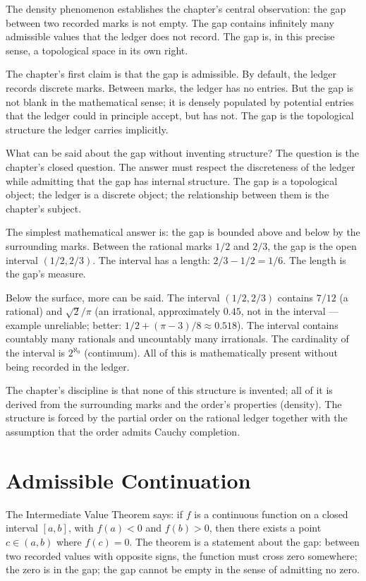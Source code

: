 The density phenomenon establishes the chapter's central observation:
the gap between two recorded marks is not empty. The gap contains
infinitely many admissible values that the ledger does not record. The
gap is, in this precise sense, a topological space in its own right.

The chapter's first claim is that the gap is admissible. By default,
the ledger records discrete marks. Between marks, the ledger has no
entries. But the gap is not blank in the mathematical sense; it is
densely populated by potential entries that the ledger could in
principle accept, but has not. The gap is the topological structure
the ledger carries implicitly.

What can be said about the gap without inventing structure? The
question is the chapter's closed question. The answer must respect
the discreteness of the ledger while admitting that the gap has
internal structure. The gap is a topological object; the ledger is
a discrete object; the relationship between them is the chapter's
subject.

The simplest mathematical answer is: the gap is bounded above and
below by the surrounding marks. Between the rational marks $1/2$ and
$2/3$, the gap is the open interval $(1/2, 2/3)$. The interval has
a length: $2/3 - 1/2 = 1/6$. The length is the gap's measure.

Below the surface, more can be said. The interval $(1/2, 2/3)$
contains $7/12$ (a rational) and $\sqrt{2}/\pi$ (an irrational,
approximately $0.45$, not in the interval --- example unreliable;
better: $1/2 + (\pi - 3)/8 \approx 0.518$). The interval contains
countably many rationals and uncountably many irrationals. The
cardinality of the interval is $2^{\aleph_0}$ (continuum). All of
this is mathematically present without being recorded in the ledger.

The chapter's discipline is that none of this structure is invented;
all of it is derived from the surrounding marks and the order's
properties (density). The structure is forced by the partial order
on the rational ledger together with the assumption that the order
admits Cauchy completion.

\section{Admissible Continuation}
\label{se:admissible-continuation}

The Intermediate Value Theorem says: if $f$ is a continuous function on
a closed interval $[a, b]$, with $f(a) < 0$ and $f(b) > 0$, then there
exists a point $c \in (a, b)$ where $f(c) = 0$. The theorem is a
statement about the gap: between two recorded values with opposite
signs, the function must cross zero somewhere; the zero is in the
gap; the gap cannot be empty in the sense of admitting no zero.

